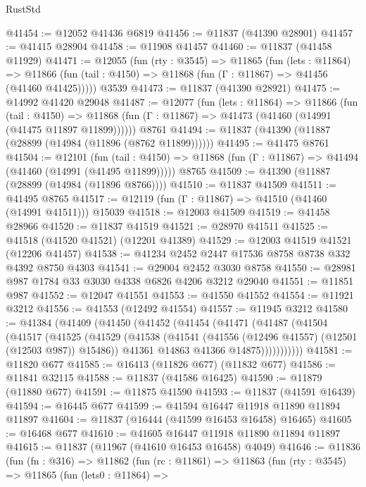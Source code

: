 \begin{lexlean}{RustStd}
\begin{coremodule}
{\begin{coremodule}
{{{{{{{{{{{{{{{{{{{{{{{{{{{{{{{{{{{{{{{{{{{{{{{{{{@41454 := @12052 @41436 @6819
@41456 := @11837 (@41390 @28901)
@41457 := @41415 @28904
@41458 := @11908 @41457
@41460 := @11837 (@41458 @11929)
@41471 := @12055
    (fun (rty : @3545) =>
    @11865
      (fun (lets : @11864) =>
      @11866 (fun (tail : @4150) => @11868 (fun (Γ : @11867) => @41456 (@41460 @41425)))))
    @3539
@41473 := @11837 (@41390 @28921)
@41475 := @14992 @41420 @29048
@41487 := @12077
    (fun (lets : @11864) =>
    @11866
      (fun (tail : @4150) =>
      @11868 (fun (Γ : @11867) => @41473 (@41460 (@14991 (@41475 @11897 @11899))))))
    @8761
@41494 := @11837 (@41390 (@11887 (@28899 (@14984 (@11896 (@8762 @11899))))))
@41495 := @41475 @8761
@41504 := @12101
    (fun (tail : @4150) => @11868 (fun (Γ : @11867) => @41494 (@41460 (@14991 (@41495 @11899)))))
    @8765
@41509 := @41390 (@11887 (@28899 (@14984 (@11896 @8766))))
@41510 := @11837 @41509
@41511 := @41495 @8765
@41517 := @12119 (fun (Γ : @11867) => @41510 (@41460 (@14991 @41511))) @15039
@41518 := @12003 @41509
@41519 := @41458 @28966
@41520 := @11837 @41519
@41521 := @28970 @41511
@41525 := @41518 (@41520 @41521) (@12201 @41389)
@41529 := @12003 @41519 @41521 (@12206 @41457)
@41538 := @41234 @2452 @2447 @17536 @8758 @8738 @332 @4392 @8750 @4303
@41541 := @29004 @2452 @3030 @8758
@41550 := @28981 @987 @1784 @33 @3030 @4338 @6826 @4206 @3212 @29040
@41551 := @11851 @987
@41552 := @12047 @41551
@41553 := @41550 @41552
@41554 := @11921 @3212
@41556 := @41553 (@12492 @41554)
@41557 := @11945 @3212
@41580 := @41384
    (@41409
      (@41450
        (@41452
          (@41454
            (@41471
              (@41487
                (@41504
                  (@41517
                    (@41525
                      (@41529
                        (@41538
                          (@41541 (@41556 (@12496 @41557) (@12501 (@12503 @987)) @15486))
                          @41361
                          @14863
                          @41366
                          @14875)))))))))))
@41581 := @11820 @677
@41585 := @16413 (@11826 @677) (@11832 @677)
@41586 := @11841 @32115
@41588 := @11837 (@41586 @16425)
@41590 := @11879 (@11880 @677)
@41591 := @11875 @41590
@41593 := @11837 (@41591 @16439)
@41594 := @16445 @677
@41599 := @41594 @16447 @11918 @11890 @11894 @11897
@41604 := @11837 (@16444 (@41599 @16453 @16458) @16465)
@41605 := @16468 @677
@41610 := @41605 @16447 @11918 @11890 @11894 @11897
@41615 := @11837 (@11967 (@41610 @16453 @16458) @4049)
@41646 := @11836
    (fun (fn : @316) =>
    @11862
      (fun (rc : @11861) =>
      @11863
        (fun (rty : @3545) =>
        @11865
          (fun (lets0 : @11864) =>
}}}}}}}}}}}}}}}}}}}}}}}}}}}}}}}}}}}}}}}}}}}}}}}}}}
\end{coremodule}}
\end{coremodule}
\end{lexlean}
